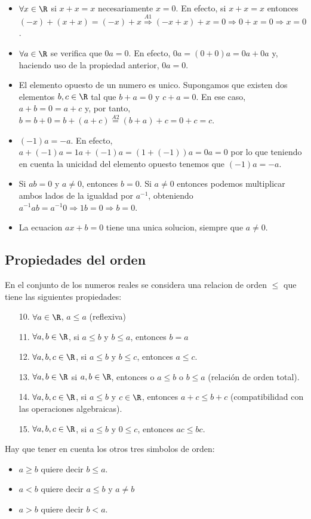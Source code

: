 \begin{itemize}
	\item \(\forall x \in \R \) si \(x + x = x \) necesariamente \(x = 0 \). En efecto, si \(x + x = x \) entonces \((-x) + (x + x ) = (-x) + x \overset{A1}{\Rightarrow} (-x + x) + x = 0 \Rightarrow 0 + x = 0 \Rightarrow x = 0\).
	\item \(\forall a \in \R \) se verifica que \(0a = 0 \). En efecto, \(0a = (0 + 0)a = 0a + 0a \) y, haciendo uso de la propiedad anterior, \(0a = 0 \).
	\item El elemento opuesto de un numero es unico. Supongamos que existen dos elementos \(b,c \in \R \) tal que \(b + a = 0 \) y \(c + a = 0 \). En ese caso, \(a + b = 0 = a + c \) y, por tanto,  \(b = b + 0 = b + (a + c) \overset{A2}{=}(b + a) + c = 0 + c = c \).
	\item \((-1)a = -a \). En efecto, \(a + (-1)a = 1a + (-1)a = (1 + (-1))a = 0a = 0\) por lo que teniendo en cuenta la unicidad del elemento opuesto tenemos que \((-1)a= -a \).
	\item Si \(ab = 0 \) y \(a \neq 0 \), entonces \(b = 0\). Si \(a \neq 0 \) entonces podemos multiplicar ambos lados de la igualdad por \(a^{-1} \), obteniendo \(a^{-1} ab = a^{-1} 0 \Rightarrow 1b = 0 \Rightarrow b = 0 \).
	\item La ecuacion \(ax + b = 0 \) tiene una unica solucion, siempre que \(a \neq 0 \).
\end{itemize}
\subsection{Propiedades del orden}
En el conjunto de los numeros reales se considera una relacion de orden \(\leq \) que tiene las siguientes propiedades:
\begin{enumerate}
	\item[10.] \(\forall a \in \R\), \( a \leq a \) (reflexiva)
	\item[11.] \(\forall a,b \in \R \), si \(a \leq b \) y \(b \leq a \), entonces \(b = a \)
	\item[12.] \(\forall a,b,c \in \R \), si \(a \leq b \) y \(b \leq  c\), entonces \(a \leq  c \).
	\item[13.] \(\forall a,b \in \R \) si \(a,b \in \R \), entonces o \(a \leq b \) o \(b \leq a \) (relación de orden total).
	\item[14.] \(\forall a,b,c \in \R \), si \(a \leq b \) y \(c \in \R \), entonces \(a + c \leq b + c \) (compatibilidad con las operaciones algebraicas).
	\item[15.] \(\forall a,b, c \in \R \), si \(a \leq b \) y \(0 \leq  c \), entonces \(ac \leq bc\).
\end{enumerate}
\begin{remark}
	Hay que tener en cuenta los otros tres simbolos de orden:
	\begin{itemize}
		\item \(a \geq b \) quiere decir \(b \leq a \).
		\item \(a < b \) quiere decir \(a \leq b \) y \(a \neq b \)
		\item \(a > b \) quiere decir \(b < a \).
	\end{itemize}
\end{remark}

